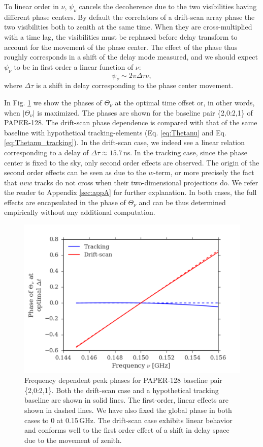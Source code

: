 \documentclass[twocolumn,apj,numberedappendix]{emulateapj}
\renewcommand\[{\begin{equation}}
\renewcommand\]{\end{equation}}
\begin{document}
To linear order in $\nu$, $\psi_\nu$ cancels the decoherence due to the two visibilities having different phase centers. By default the correlators of a drift-scan array phase the two visibilities both to zenith at the same time. When they are cross-multiplied with a time lag, the visibilities must be rephased before delay transform to account for the movement of the phase center. The effect of the phase thus roughly corresponds in a shift of the delay mode measured, and we should expect $\psi_{\nu}$ to be in first order a linear function of $\nu$:
\[
\psi_{\nu}\sim 2\pi\Delta\tau\nu,
\]
where $\Delta\tau$ is a shift in delay corresponding to the phase center movement. 

In Fig. \ref{fig:phi_nu} we show the phases of $\Theta_\nu$ at the optimal time offset or, in other words, when $|\Theta_\nu|$ is maximized. The phases are shown for the baseline pair \{2,0:2,1\} of PAPER-128. The drift-scan phase dependence is compared with that of the same baseline with hypothetical tracking-elements (Eq. \eqref{eq:Thetanu} and Eq. \eqref{eq:Thetanu_tracking}). In the drift-scan case, we indeed see a linear relation corresponding to a delay of $\Delta\tau\approx15.7$\,ns. In the tracking case, since the phase center is fixed to the sky, only second order effects are observed. The origin of the second order effects can be seen as due to the $w$-term, or more precisely the fact that $uvw$ tracks do not cross when their two-dimensional projections do. We refer the reader to Appendix \ref{sec:appA} for further explanation. In both cases, the full effects are encapsulated in the phase of $\Theta_\nu$ and can be thus determined empirically without any additional computation. 

\begin{figure}[H]
\includegraphics[width=1\linewidth]{phi_nu}

\caption{Frequency dependent peak phases for PAPER-128 baseline pair \{2,0:2,1\}. Both the drift-scan case and a hypothetical tracking baseline are shown in solid lines. The first-order, linear effects are shown in dashed lines. We have also fixed the global phase in both cases to 0 at 0.15\,GHz. The drift-scan case exhibits linear behavior and conforms well to the first order effect of a shift in delay space due to the movement of zenith. }
\label{fig:phi_nu}
\end{figure}
\end{document}
